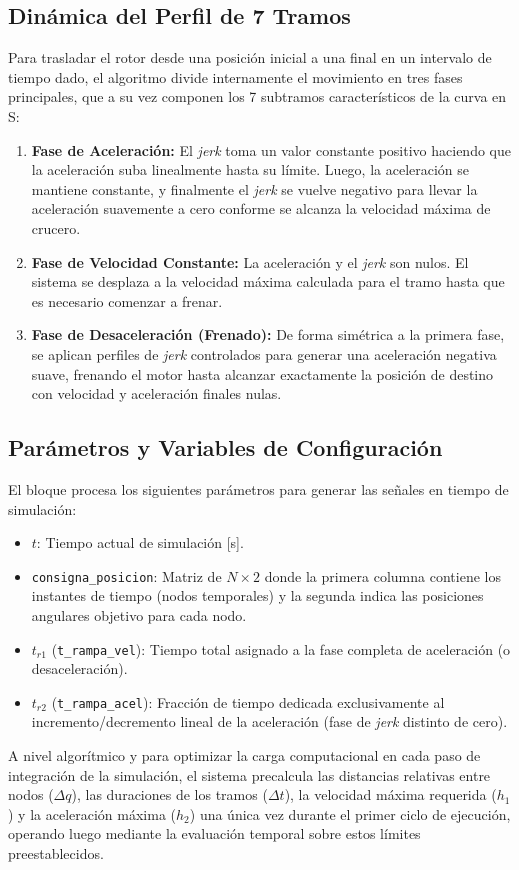 \documentclass[12pt, a4paper,journal, onecolumn, compsoc]{IEEEtran}
\begin{document}
\subsection{Dinámica del Perfil de 7 Tramos}
Para trasladar el rotor desde una posición inicial a una final en un intervalo de tiempo dado, el algoritmo divide internamente el movimiento en tres fases principales, que a su vez componen los 7 subtramos característicos de la curva en S:
\begin{enumerate}
    \item \textbf{Fase de Aceleración:} El \textit{jerk} toma un valor constante positivo haciendo que la aceleración suba linealmente hasta su límite. Luego, la aceleración se mantiene constante, y finalmente el \textit{jerk} se vuelve negativo para llevar la aceleración suavemente a cero conforme se alcanza la velocidad máxima de crucero.
    \item \textbf{Fase de Velocidad Constante:} La aceleración y el \textit{jerk} son nulos. El sistema se desplaza a la velocidad máxima calculada para el tramo hasta que es necesario comenzar a frenar.
    \item \textbf{Fase de Desaceleración (Frenado):} De forma simétrica a la primera fase, se aplican perfiles de \textit{jerk} controlados para generar una aceleración negativa suave, frenando el motor hasta alcanzar exactamente la posición de destino con velocidad y aceleración finales nulas.
\end{enumerate}

\subsection{Parámetros y Variables de Configuración}
El bloque procesa los siguientes parámetros para generar las señales en tiempo de simulación:
\begin{itemize}
    \item $t$: Tiempo actual de simulación [s].
    \item \texttt{consigna\_posicion}: Matriz de $N \times 2$ donde la primera columna contiene los instantes de tiempo (nodos temporales) y la segunda indica las posiciones angulares objetivo para cada nodo.
    \item $t_{r1}$ (\texttt{t\_rampa\_vel}): Tiempo total asignado a la fase completa de aceleración (o desaceleración).
    \item $t_{r2}$ (\texttt{t\_rampa\_acel}): Fracción de tiempo dedicada exclusivamente al incremento/decremento lineal de la aceleración (fase de \textit{jerk} distinto de cero).
\end{itemize}

A nivel algorítmico y para optimizar la carga computacional en cada paso de integración de la simulación, el sistema precalcula las distancias relativas entre nodos ($\Delta q$), las duraciones de los tramos ($\Delta t$), la velocidad máxima requerida ($h_1$) y la aceleración máxima ($h_2$) una única vez durante el primer ciclo de ejecución, operando luego mediante la evaluación temporal sobre estos límites preestablecidos.
\label{anexo:gen_trayectorias}
\end{document}
